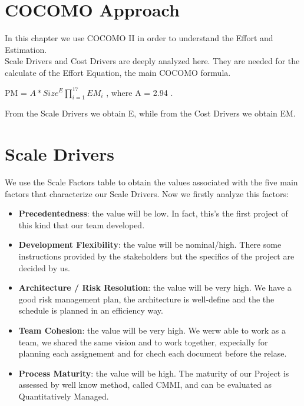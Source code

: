 \section{COCOMO Approach}
In this chapter we use COCOMO II in order to understand the Effort and Estimation. 
\\Scale Drivers and Cost Drivers are deeply analyzed here. They are needed for the calculate of the Effort Equation, the main COCOMO formula.
\\\begin{center} PM = $A * Size^E \prod_{i=1}^{17} EM_i$ 	, where A = 2.94 . \end{center}
From the Scale Drivers we obtain E, while from the Cost Drivers we obtain EM. 
\section{Scale Drivers}
We use the Scale Factors table to obtain the values associated with the five main factors that characterize our Scale Drivers. %
Now we firstly analyze this factors:
\begin{itemize}
    \item \textbf{Precedentedness}: the value will be low. In fact, this's the first project of this kind that our team developed.
    \item \textbf{Development Flexibility}: the value will be nominal/high. There some instructions provided by the stakeholders but the specifics of the project are decided by us.
    \item \textbf{Architecture / Risk Resolution}: the value will be very high. We have a good risk management plan, the architecture is well-define and the the schedule is planned in an efficiency way.
    \item \textbf{Team Cohesion}: the value will be very high. We werw able to work as a team, we shared the same vision and to work together, expecially for planning each assignement and for chech each document before the relase.
    \item \textbf{Process Maturity}: the value will be high. The maturity of our Project is assessed by well know method, called CMMI, and can be evaluated as Quantitatively Managed.
\end{itemize}

